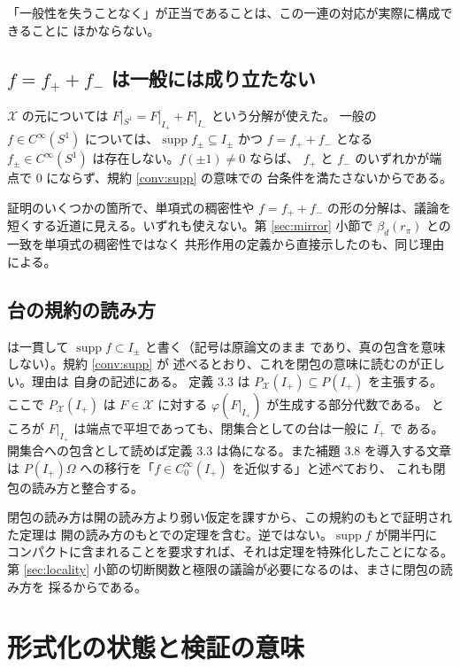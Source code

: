 \documentclass[11pt,a4paper]{article}
\newcommand{\Circ}{S^{1}}
\newcommand{\Xcl}{\mathcal{X}}
\theoremstyle{definition}
\begin{document}
「一般性を失うことなく」が正当であることは、この一連の対応が実際に構成できることに
ほかならない。

\subsection{\texorpdfstring{$f = f_+ + f_-$ は一般には成り立たない}{f = f+ + f- は一般には成り立たない}}
\label{sec:nonsplit}

$\Xcl$ の元については $F|_{\Circ} = F|_{I_+} + F|_{I_-}$ という分解が使えた。
一般の $f \in C^\infty(\Circ)$ については、$\operatorname{supp} f_\pm \subseteq I_\pm$ かつ
$f = f_+ + f_-$ となる $f_\pm \in C^\infty(\Circ)$ は存在しない。$f(\pm 1) \ne 0$ ならば、
$f_+$ と $f_-$ のいずれかが端点で $0$ にならず、規約 \ref{conv:supp} の意味での
台条件を満たさないからである。

証明のいくつかの箇所で、単項式の稠密性や $f = f_+ + f_-$ の形の分解は、議論を
短くする近道に見える。いずれも使えない。第 \ref{sec:mirror} 小節で $\beta_d(r_\pi)$ との一致を単項式の稠密性ではなく
共形作用の定義から直接示したのも、同じ理由による。

\subsection{台の規約の読み方}
\label{sec:supp-reading}

\cite{T26} は一貫して $\operatorname{supp} f \subset I_\pm$ と書く（記号は原論文のまま
であり、真の包含を意味しない）。規約 \ref{conv:supp} が
述べるとおり、これを閉包の意味に読むのが正しい。理由は \cite{T26} 自身の記述にある。
\cite{T26} 定義 3.3 は $P_{\Xcl}(I_+) \subseteq P(I_+)$ を主張する。ここで
$P_{\Xcl}(I_+)$ は $F \in \Xcl$ に対する $\varphi(F|_{I_+})$ が生成する部分代数である。
ところが $F|_{I_+}$ は端点で平坦であっても、閉集合としての台は一般に $\overline{I_+}$ で
ある。開集合への包含として読めば定義 3.3 は偽になる。また補題 3.8 を導入する文章は
$P(I_+)\Omega$ への移行を「$f \in C_0^\infty(I_+)$ を近似する」と述べており、
これも閉包の読み方と整合する。

閉包の読み方は開の読み方より弱い仮定を課すから、この規約のもとで証明された定理は
開の読み方のもとでの定理を含む。逆ではない。$\operatorname{supp} f$ が開半円に
コンパクトに含まれることを要求すれば、それは定理を特殊化したことになる。
第 \ref{sec:locality} 小節の切断関数と極限の議論が必要になるのは、まさに閉包の読み方を
採るからである。

\section{形式化の状態と検証の意味}
\label{sec:status}
\end{document}
